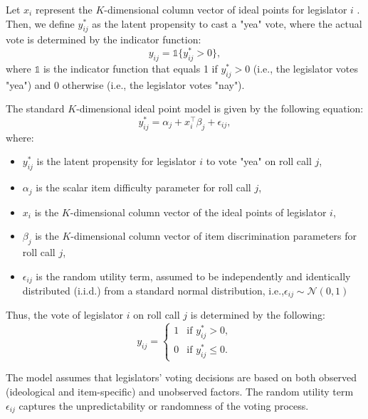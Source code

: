 \documentclass[a4paper,12pt]{report}
\begin{document}
    Let \( x_i \) represent the \( K \)-dimensional column vector of ideal points for legislator \( i \)
    . Then, we define \( y^*_{ij} \)
    as the latent propensity to cast a "yea" vote, where the actual vote is determined by the indicator function:
    \[
        y_{ij} = \mathbb{1}\{ y^*_{ij} > 0 \},
    \]
    where \( \mathbb{1} \) is the indicator function that equals 1 if \( y^*_{ij} > 0 \)
    (i.e., the legislator votes "yea") and 0 otherwise (i.e., the legislator votes "nay").

    The standard \( K \)-dimensional ideal point model is given by the following equation:
    \[
        y^*_{ij} = \alpha_j + x_i^\top \beta_j + \epsilon_{ij},
    \]
    where:
    \begin{itemize}
        \item \( y^*_{ij} \) is the latent propensity for legislator \( i \) to vote "yea" on roll call \( j \),
        \item \( \alpha_j \) is the scalar item difficulty parameter for roll call \( j \),
        \item \( x_i \) is the \( K \)-dimensional column vector of the ideal points of legislator \( i \),
        \item \( \beta_j \) is the \( K \)-dimensional column vector of item discrimination parameters for roll call
        \( j \),
        \item \( \epsilon_{ij} \)
        is the random utility term, assumed to be independently and identically distributed (i.i.d.) from a standard
        normal distribution, i.e.,\( \epsilon_{ij} \sim \mathcal{N}(0, 1) \)
    \end{itemize}

    Thus, the vote of legislator \( i \) on roll call \( j \) is determined by the following:
    \[
        y_{ij} =
        \begin{cases}
            1 & \text{if } y^*_{ij} > 0, \\
            0 & \text{if } y^*_{ij} \leq 0.
        \end{cases}
    \]

    The model assumes that legislators' voting decisions are based on both observed (ideological and item-specific) and
    unobserved factors. The random utility term \( \epsilon_{ij} \)
    captures the unpredictability or randomness of the voting process.
\end{document}
